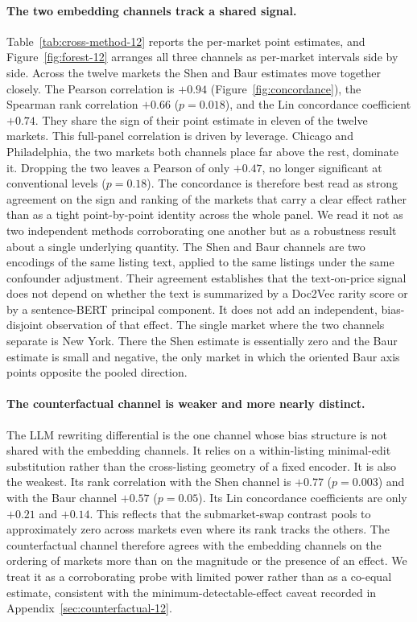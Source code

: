 \paragraph{The two embedding channels track a shared signal.}
Table~\ref{tab:cross-method-12} reports the per-market point estimates, and
Figure~\ref{fig:forest-12} arranges all three channels as per-market intervals
side by side. Across the twelve markets the Shen and Baur estimates move together closely. The Pearson correlation is $+0.94$ (Figure~\ref{fig:concordance}), the Spearman rank correlation $+0.66$ ($p = 0.018$), and the Lin concordance coefficient $+0.74$. They share the sign of their point estimate in eleven of the twelve markets. This full-panel correlation is driven by leverage. Chicago and Philadelphia, the two markets both channels place far above the rest, dominate it. Dropping the two leaves a Pearson of only $+0.47$, no longer significant at conventional levels ($p = 0.18$). The concordance is therefore best read as strong agreement on the
sign and ranking of the markets that carry a clear effect rather than as a tight
point-by-point identity across the whole panel. We read it not
as two independent methods corroborating one another but as a robustness result
about a single underlying quantity. The Shen and Baur channels are two encodings of the same listing text, applied to the same listings under the same confounder adjustment. Their agreement establishes that the text-on-price signal does not depend on whether the text is summarized by a Doc2Vec rarity score or by a sentence-BERT principal component. It does not add an independent, bias-disjoint observation of that effect. The single market where the two channels separate is New York. There the Shen estimate is essentially zero and the Baur estimate is small and negative, the only market in which the oriented Baur axis points opposite the pooled direction.

\paragraph{The counterfactual channel is weaker and more nearly distinct.}
The LLM rewriting differential is the one channel whose bias structure is not shared with the embedding channels. It relies on a within-listing minimal-edit substitution rather than the cross-listing geometry of a fixed encoder. It is also the weakest. Its rank correlation with the Shen channel is $+0.77$ ($p = 0.003$) and with the Baur channel $+0.57$ ($p = 0.05$). Its Lin concordance coefficients are only $+0.21$ and $+0.14$. This reflects that the submarket-swap contrast pools to approximately zero across markets even where its rank tracks the others. The counterfactual channel therefore agrees with the embedding channels on the ordering of markets more than on the magnitude or the presence of an effect. We treat it as a corroborating probe with limited power rather than as a co-equal estimate, consistent with the minimum-detectable-effect caveat recorded in Appendix~\ref{sec:counterfactual-12}.

